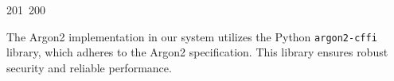201~200~\documentclass{article}
\begin{document}
	                                                                                                                                                                                                                                                                                                	                                                                                                                                        	    	                                                                                                	                                                                                                                                                                                                                                                                                                                                	                                                                        	                                                                        	                                                                                                        The Argon2 implementation in our system utilizes the Python \texttt{argon2-cffi} library, which adheres to the Argon2 specification. This library ensures robust security and reliable performance.
\end{document}
